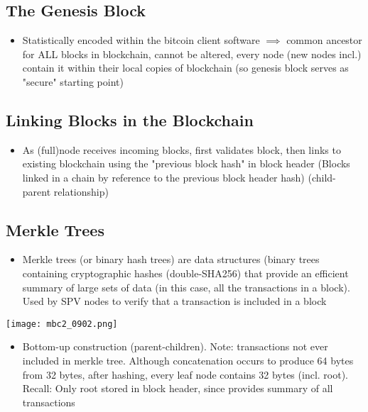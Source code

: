\documentclass[english, 11pt]{article}
\begin{document}
\subsection{The Genesis Block}
\begin{itemize}
    \item Statistically encoded within the bitcoin client software $\implies$ common ancestor for ALL blocks in blockchain, cannot be altered, every node (new nodes incl.) contain it within their local copies of blockchain (so genesis block serves as "secure" starting point)
\end{itemize}

\subsection{Linking Blocks in the Blockchain}
\begin{itemize}
    \item As (full)node receives incoming blocks, first validates block, then links to existing blockchain using the "previous block hash" in block header (Blocks linked in a chain by reference to the previous block header hash) (child-parent relationship)
\end{itemize}

\subsection{Merkle Trees}

\begin{itemize}
    \item Merkle trees (or binary hash trees) are data structures (binary trees containing cryptographic hashes (double-SHA256) that provide an efficient summary of large sets of data (in this case, all the transactions in a block). Used by SPV nodes to verify that a transaction is included in a block
\end{itemize}

\begin{tcolorbox}
\begin{minipage}{0.45\linewidth}
    \texttt{[image: mbc2\_0902.png]}
    \label{fig:fig1}  
\end{minipage}\hfil
\begin{minipage}{0.45\linewidth}
\begin{itemize}
    \item Bottom-up construction (parent-children). Note: transactions not ever included in merkle tree. Although concatenation occurs to produce 64 bytes from 32 bytes, after hashing, every leaf node contains 32 bytes (incl. root). Recall: Only root stored in block header, since provides summary of all transactions
\end{itemize}
\end{minipage}
\end{tcolorbox}
\end{document}
